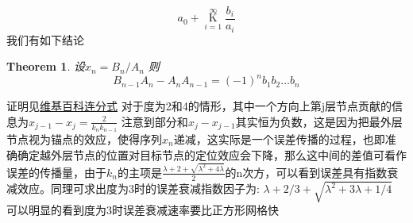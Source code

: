 \documentclass[12pt]{article}
\newtheorem{thm}{Theorem}[section]
\theoremstyle{remark}
\begin{document}
\[
a_0+\operatorname*{K}_{i=1}^{\infty}\frac{b_i}{a_i}
\]
我们有如下结论
\begin{thm}
设$x_n=B_n/A_n$
则\[
B_{n-1}A_n-A_n A_{n-1}=(-1)^n b_1b_2\dots b_n
\]
\end{thm}
证明见\href{https://en.wikipedia.org/wiki/Generalized_continued_fraction#Partial\_numerators\_and\_denominators}{维基百科连分式}
对于度为2和4的情形，其中一个方向上第j层节点贡献的信息为$x_{j-1}-x_j=\frac{2}{k_n k_{n-1}}$
注意到部分和$x_j-x_{j-1}$其实恒为负数，这是因为把最外层节点视为锚点的效应，使得序列$x_n$递减，这实际是一个误差传播的过程，也即准确确定越外层节点的位置对目标节点的定位效应会下降，那么这中间的差值可看作误差的传播量，由于$k_n$的主项是$\frac{\lambda+2+\sqrt{\lambda^2+4\lambda}}{2}$的n次方，可以看到误差具有指数衰减效应。同理可求出度为3时的误差衰减指数因子为:
$\lambda+2/3+ \sqrt{\lambda^2+3\lambda+1/4}$
可以明显的看到度为3时误差衰减速率要比正方形网格快
\end{document}
